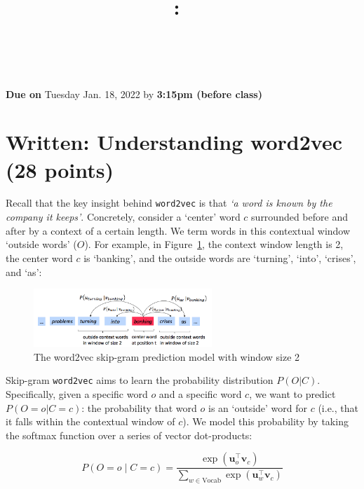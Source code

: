 \documentclass{article}
\title{
    \vspace{-1in}
    \textmd{\textbf{\hmwkClass:\ \hmwkTitle} \\ \hmwkAuthorName}\\
}
\author{}
\date{}
\begin{document}
    \maketitle
    \vspace{-.7in}

    \begin{center}
        \large{\textbf{Due on} Tuesday Jan. 18, 2022 by \textbf{3:15pm (before class)}}
    \end{center}


    \section{Written: Understanding word2vec (28 points)}
    Recall that the key insight behind \texttt{word2vec} is that \textit{`a word is known by the company it keeps'}. Concretely, consider a `center' word $c$ surrounded before and after by a context of a certain length. We term words in this contextual window `outside words' ($O$). For example, in Figure~\ref{fig:word2vec}, the context window length is 2, the center word $c$ is `banking', and the outside words are `turning', `into', `crises', and `as':

    \begin{figure}[h]
        \centering
        \includegraphics[width=0.6\textwidth]{word2vec.png}
        \caption{The word2vec skip-gram prediction model with window size 2}
        \label{fig:word2vec}
    \end{figure}

    Skip-gram \texttt{word2vec} aims to learn the probability distribution $P(O|C)$.
    Specifically, given a specific word $o$ and a specific word $c$, we want to predict $P(O=o|C=c)$: the probability that word $o$ is an `outside' word for $c$ (i.e., that it falls within the contextual window of $c$).
    We model this probability by taking the softmax function over a series of vector dot-products: %

    \begin{equation}
        P(O=o \mid C=c) = \frac{\exp(\bm u_{o}^\top \bm v_c)}{\sum_{w \in \text{Vocab}} \exp(\bm u_{w}^\top \bm v_c)}
        \label{eq:word2vec_condprob}
    \end{equation}
\end{document}
